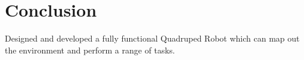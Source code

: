\chapter{Conclusion}
Designed and developed a fully functional Quadruped Robot which can map out the environment and perform a range of tasks.